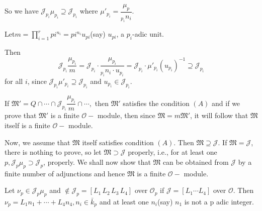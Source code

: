 So we have $\mathcal{J}_{p_i} \mu_{p_i} \supseteq \mathcal{J}_{p_i}$ where
$\mu'_{p_i} = \dfrac{\mu_{p}}{{}_{p_i} n_i}$. 

Let\pageoriginale $m = \prod \limits^{r}_{i=1} pi^{n_i} = pi^{n_i} u_{pi}$(say)
$u_{pi}$, a $p_i$-adic unit. 

Then
$$
\mathcal{J}_{p_i} \frac{\mu_{p_i}}{m} =
\mathcal{J}_{p_i}\cdot \frac{\mu_{p_i}}{{}_{p_i}{n_i}\cdot u_{p_i}} =
\mathcal{J}_{p_i}\cdot \mu'_{p_i}(u_{p_i})^{-1} \supseteq \mathcal{J}_{p_i} 
$$
for all $i$, since $\mathcal{J}_{p_i} \mu'_{p_i} \supseteq \mathcal{J}_{p_i}$
and $u_{p_i} \in \mathcal{J}_{p_i}$. 

If $\mathfrak{M}' = Q \cap \cdots \cap \mathcal{J}_{p_i}
\dfrac{\mu_{p_i}}{m} \cap \cdots,  $ then $\mathfrak{M}'$ satisfies the
condition $(A)$ and if we prove that $\mathfrak{M}'$ is a finite
$\mathscr{O}-$ module, then since $\mathfrak{M} = m \mathfrak{M}'$, it
will follow that $\mathfrak{M}$ itself is a finite $\mathscr{O}-$
module. 

Now, we assume that $\mathfrak{M}$ itself satisfies condition
$(A)$. Then $\mathfrak{M} \supseteq \mathcal{J}$. If $\mathfrak{M} =
\mathcal{J}$, there is nothing to prove, so let $\mathfrak{M} \supset
\mathcal{J}$ properly, i.e., for at least one $p, \mathcal{J}_{p}
\mu_p \supset \mathcal{J}_{p}$, properly. We shall now show that
$\mathfrak{M}$ can be obtained from $\mathcal{J}$ by a finite number
of adjunctions and hence $\mathfrak{M}$ is a finite $\mathscr{O}-$
module. 

Let $\nu_p \in \mathcal{J}_p \mu_p$ and $\notin \mathcal{J}_{p} = [L_1\,
  L_2 \,L_3 \,L_4]$ over $\mathscr{O}_p$ if $\mathcal{J} = [L_1 \cdots
  L_4]$ over $\mathscr{O}$. Then $\nu_p = L_1 n_1 + \cdots + L_4 n_4,
n_i \in \bar{k}_p$ and at least one $n_i$(say) $n_1$ is not a p adic
integer. 

